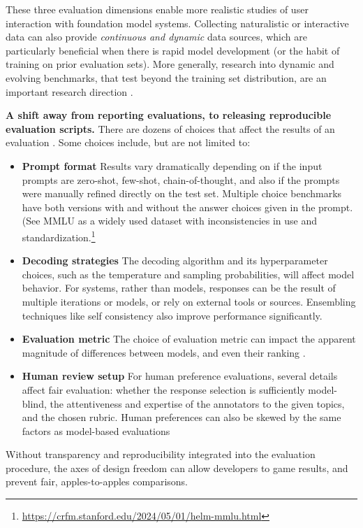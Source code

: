 These three evaluation dimensions enable more realistic studies of user interaction with foundation model systems.
Collecting naturalistic or interactive data can also provide \textit{continuous and dynamic} data sources, which are particularly beneficial when there is rapid model development (or the habit of training on prior evaluation sets).
More generally, research into dynamic and evolving benchmarks, that test beyond the training set distribution, are an important research direction \citep{yu2023skill, kiela2021dynabench}.


\textbf{A shift away from reporting evaluations, to releasing reproducible evaluation scripts.} 
There are dozens of choices that affect the results of an evaluation \citep{Anthropic2023}.
Some choices include, but are not limited to:
\begin{itemize}
    \item \textbf{Prompt format} Results vary dramatically depending on if the input prompts are zero-shot, few-shot, chain-of-thought, and also if the prompts were manually refined directly on the test set. Multiple choice benchmarks have both versions with and without the answer choices given in the prompt. (See MMLU as a widely used dataset with inconsistencies in use and standardization.\footnote{\url{https://crfm.stanford.edu/2024/05/01/helm-mmlu.html}}
    \item \textbf{Decoding strategies} The decoding algorithm and its hyperparameter choices, such as the temperature and sampling probabilities, will affect model behavior. For systems, rather than models, responses can be the result of multiple iterations or models, or rely on external tools or sources. Ensembling techniques like self consistency \citep{wang2022self} also improve performance significantly.
    \item \textbf{Evaluation metric} The choice of evaluation metric can impact the apparent magnitude of differences between models, and even their ranking \citep{schaeffer2024emergent}. 
    \item \textbf{Human review setup} For human preference evaluations, several details affect fair evaluation: whether the response selection is sufficiently model-blind, the attentiveness and expertise of the annotators to the given topics, and the chosen rubric. Human preferences can also be skewed by the same factors as model-based evaluations \citep{hosking2024human, xu-etal-2023-critical, wu2023style}
\end{itemize}
Without transparency and reproducibility integrated into the evaluation procedure, the axes of design freedom can allow developers to game results, and prevent fair, apples-to-apples comparisons.
